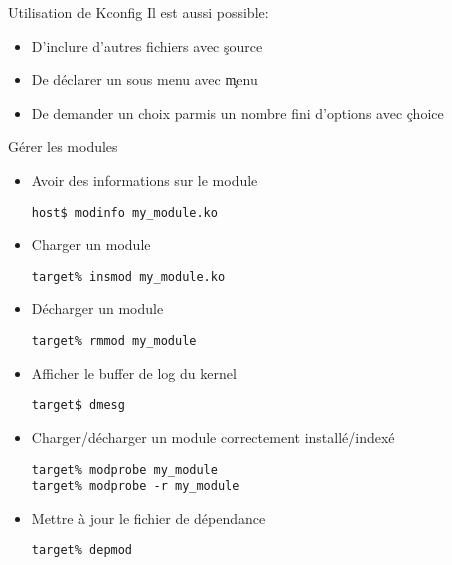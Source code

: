 \begin{frame}[fragile=singleslide]{Utilisation de Kconfig}
  Il est aussi possible:
  \begin{itemize} 
  \item D'inclure d'autres fichiers avec \c{source}
  \item De déclarer un sous menu avec \c{menu}
  \item  De demander  un choix  parmis un  nombre fini  d'options avec
    \c{choice}
  \end{itemize} 
\end{frame}

\begin{frame}[fragile=singleslide]{Gérer les modules}
  \begin{itemize} 
  \item Avoir des informations sur le module
    \begin{lstlisting}
host$ modinfo my_module.ko
    \end{lstlisting} %
  \item Charger un module
    \begin{lstlisting}
target% insmod my_module.ko
    \end{lstlisting} %
  \item Décharger un module
    \begin{lstlisting}
target% rmmod my_module
    \end{lstlisting}%
  \item Afficher le buffer de log du kernel
    \begin{lstlisting}
target$ dmesg
    \end{lstlisting} %
  \item Charger/décharger un module correctement installé/indexé
    \begin{lstlisting}
target% modprobe my_module
target% modprobe -r my_module
    \end{lstlisting} %
  \item Mettre à jour le fichier de dépendance
    \begin{lstlisting} 
target% depmod
    \end{lstlisting} %
  \end{itemize}
\end{frame}

